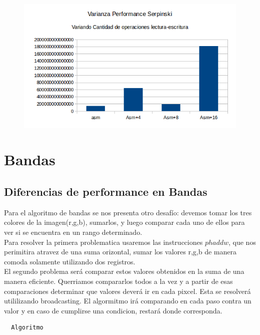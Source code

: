 \documentclass[a4paper]{article}
\begin{document}
\begin{figure}[h!]
  \begin{center}
  \includegraphics[scale=0.66]{Graficos1.5/sie/pushpop/var.png}
  \label{nombreparareferenciar1}
  \end{center}
\end{figure}



\newpage
\section{Bandas}
\subsection{Diferencias de performance en Bandas}
Para el algoritmo de bandas se nos presenta otro desafío: devemos tomar los tres colores de la imagen(r,g,b), sumarlos, y luego comparar cada uno de ellos para ver si se encuentra en un rango determinado.
\\
Para resolver la primera problematica usaremos las instrucciones $phaddw$, que nos perimitira atravez de una suma orizontal, sumar los valores r,g,b de manera comoda solamente utilizando dos registros.
\\
El segundo problema será comparar estos valores obtenidos en la suma de una manera eficiente. Querriamos compararlos todos a la vez y a partir de esas comparaciones determinar que valores deverá ir en cada pixcel. Esta se resolverá utililizando broadcasting. El algormitmo irá comparando en cada paso contra un valor y en caso de cumplirse una condicion, restará donde corresponda.

\begin{codesnippet}
\begin{verbatim}
  Algoritmo
\end{verbatim}
\end{codesnippet}
\end{document}
